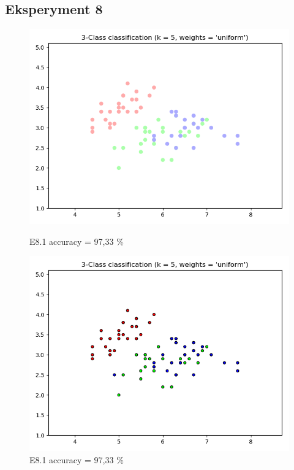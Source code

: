 \documentclass{classrep}
\begin{document}
	\subsection{Eksperyment 8}
		\begin{figure}[H]
			\begin{minipage}{0.5\linewidth}
				\centering
				\includegraphics[scale=0.25]{KNN_iris_8_1.png}
				\caption{E8.1 accuracy = 97,33 \%}
			\end{minipage}
			\begin{minipage}{0.5\linewidth}
				\centering
				\includegraphics[scale=0.25]{KNN_iris_8_2.png}
				\caption{E8.1 accuracy = 97,33 \%}
				\label{E8.1}
			\end{minipage}

\end{figure}
\end{document}
